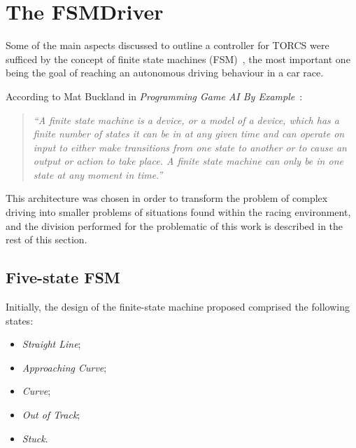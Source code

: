\section{\textbf{The FSMDriver}} \label{sec:FSM}
	
	Some of the main aspects discussed to outline a controller for TORCS were sufficed by the concept of finite state
	machines (FSM)~\cite{Millington:2006:FSM}, the most important one being the goal of reaching an autonomous driving
	behaviour in a car race.

	According to Mat Buckland in \emph{Programming Game AI By Example}~\cite{Buckland:2005:AI}:
	
	\begin{quotation}
		
		\emph{
			``A finite state machine is a device, or a model of a device, which has a finite number of states it can be in
			at any given time and can operate on input to either make transitions from one state to another or to cause
			an output or action to take place. A finite state machine can only be in one state at any moment in time.''}
		
	\end{quotation}
	
	This architecture was chosen in order to transform the problem of complex driving into smaller problems of
	situations found within the racing environment, and the division performed for the problematic of this work is
	described in the rest of this section.
	
\subsection{Five-state FSM} \label{subsec:FSM5}
	
	Initially, the design of the finite-state machine proposed comprised the following states:
	
	\begin{itemize}

	\item \emph{Straight Line};
	
	\item \emph{Approaching Curve};
	
	\item \emph{Curve};
	
	\item \emph{Out of Track};
	
	\item \emph{Stuck}.

	\end{itemize}
	
